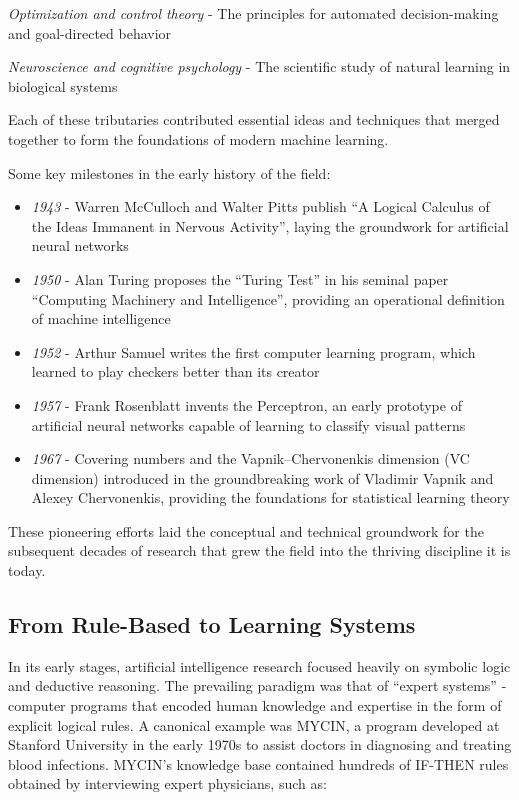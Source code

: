 \documentclass[
  9pt,
  letterpaper,
  abstract,
  titlepage]{scrbook}
\begin{document}
\emph{Optimization and control theory} - The principles for automated
decision-making and goal-directed behavior

\emph{Neuroscience and cognitive psychology} - The scientific study of
natural learning in biological systems

Each of these tributaries contributed essential ideas and techniques
that merged together to form the foundations of modern machine learning.

Some key milestones in the early history of the field:

\begin{itemize}
\item
  \emph{1943} - Warren McCulloch and Walter Pitts publish ``A Logical
  Calculus of the Ideas Immanent in Nervous Activity'', laying the
  groundwork for artificial neural networks
\item
  \emph{1950} - Alan Turing proposes the ``Turing Test'' in his seminal
  paper ``Computing Machinery and Intelligence'', providing an
  operational definition of machine intelligence
\item
  \emph{1952} - Arthur Samuel writes the first computer learning
  program, which learned to play checkers better than its creator
\item
  \emph{1957} - Frank Rosenblatt invents the Perceptron, an early
  prototype of artificial neural networks capable of learning to
  classify visual patterns
\item
  \emph{1967} - Covering numbers and the Vapnik--Chervonenkis dimension
  (VC dimension) introduced in the groundbreaking work of Vladimir
  Vapnik and Alexey Chervonenkis, providing the foundations for
  statistical learning theory
\end{itemize}

These pioneering efforts laid the conceptual and technical groundwork
for the subsequent decades of research that grew the field into the
thriving discipline it is today.

\subsection{From Rule-Based to Learning
Systems}\label{from-rule-based-to-learning-systems}

In its early stages, artificial intelligence research focused heavily on
symbolic logic and deductive reasoning. The prevailing paradigm was that
of ``expert systems'' - computer programs that encoded human knowledge
and expertise in the form of explicit logical rules. A canonical example
was MYCIN, a program developed at Stanford University in the early 1970s
to assist doctors in diagnosing and treating blood infections. MYCIN's
knowledge base contained hundreds of IF-THEN rules obtained by
interviewing expert physicians, such as:
\end{document}
